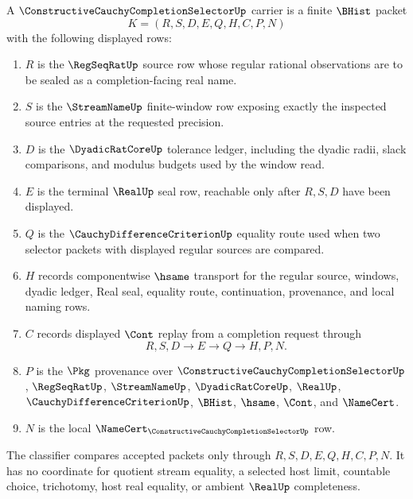 \begin{definition}
\label{def:constructive-cauchy-completion-selector-carrier}
A $\ConstructiveCauchyCompletionSelectorUp$ carrier is a finite $\BHist$ packet
$$
K=(R,S,D,E,Q,H,C,P,N)
$$
with the following displayed rows:
\begin{enumerate}
\item $R$ is the $\RegSeqRatUp$ source row whose regular rational observations are to be sealed as a completion-facing real name.
\item $S$ is the $\StreamNameUp$ finite-window row exposing exactly the inspected source entries at the requested precision.
\item $D$ is the $\DyadicRatCoreUp$ tolerance ledger, including the dyadic radii, slack comparisons, and modulus budgets used by the window read.
\item $E$ is the terminal $\RealUp$ seal row, reachable only after $R,S,D$ have been displayed.
\item $Q$ is the $\CauchyDifferenceCriterionUp$ equality route used when two selector packets with displayed regular sources are compared.
\item $H$ records componentwise $\hsame$ transport for the regular source, windows, dyadic ledger, Real seal, equality route, continuation, provenance, and local naming rows.
\item $C$ records displayed $\Cont$ replay from a completion request through
$$
R,S,D \longrightarrow E \longrightarrow Q \longrightarrow H,P,N .
$$
\item $P$ is the $\Pkg$ provenance over $\ConstructiveCauchyCompletionSelectorUp$, $\RegSeqRatUp$, $\StreamNameUp$, $\DyadicRatCoreUp$, $\RealUp$, $\CauchyDifferenceCriterionUp$, $\BHist$, $\hsame$, $\Cont$, and $\NameCert$.
\item $N$ is the local $\NameCert_{\ConstructiveCauchyCompletionSelectorUp}$ row.
\end{enumerate}
The classifier compares accepted packets only through $R,S,D,E,Q,H,C,P,N$. It has no coordinate for quotient stream equality, a selected host limit, countable choice, trichotomy, host real equality, or ambient $\RealUp$ completeness.
\end{definition}

